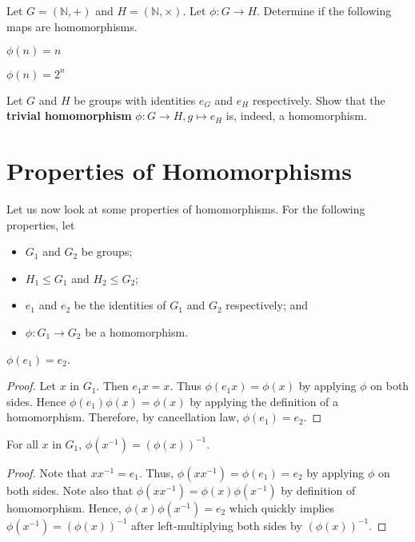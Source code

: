 \begin{exercise}
    Let $G = (\mathbb{N}, +)$ and $H = (\mathbb{N}, \times)$. Let $\phi: G \to H$. Determine if the following maps are homomorphisms.
    \begin{partquestions}{\alph*}
        \item $\phi(n) = n$
        \item $\phi(n) = 2^n$
    \end{partquestions}
\end{exercise}
\begin{exercise}
    Let $G$ and $H$ be groups with identities $e_G$ and $e_H$ respectively. Show that the \textbf{trivial homomorphism} $\phi: G \to H, g \mapsto e_H$ is, indeed, a homomorphism.
\end{exercise}

\section{Properties of Homomorphisms}
Let us now look at some properties of homomorphisms. For the following properties, let
\begin{itemize}
    \item $G_1$ and $G_2$ be groups;
    \item $H_1 \leq G_1$ and $H_2 \leq G_2$;
    \item $e_1$ and $e_2$ be the identities of $G_1$ and $G_2$ respectively; and
    \item $\phi: G_1 \to G_2$ be a homomorphism.
\end{itemize}

\begin{proposition}\label{prop-homomorphism-maps-identities-to-each-other}
    $\phi(e_1) = e_2$.
\end{proposition}
\begin{proof}
    Let $x$ in $G_1$. Then $e_1x = x$. Thus $\phi(e_1x) = \phi(x)$ by applying $\phi$ on both sides. Hence $\phi(e_1)\phi(x) = \phi(x)$ by applying the definition of a homomorphism. Therefore, by cancellation law, $\phi(e_1) = e_2$.
\end{proof}

\begin{proposition}\label{prop-homomorphism-maps-inverses}
    For all $x$ in $G_1$, $\phi(x^{-1}) = \left(\phi(x)\right)^{-1}$.
\end{proposition}
\begin{proof}
    Note that $xx^{-1} = e_1$. Thus, $\phi(xx^{-1}) = \phi(e_1) = e_2$ by applying $\phi$ on both sides. Note also that $\phi(xx^{-1}) = \phi(x)\phi(x^{-1})$ by definition of homomorphism. Hence, $\phi(x)\phi(x^{-1}) = e_2$ which quickly implies $\phi(x^{-1}) = \left(\phi(x)\right)^{-1}$ after left-multiplying both sides by $\left(\phi(x)\right)^{-1}$.
\end{proof}

